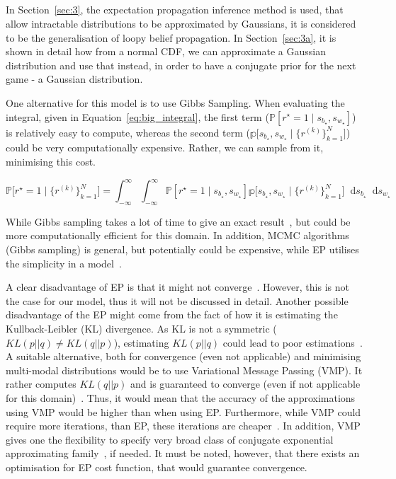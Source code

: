 \documentclass[a4paper,11pt]{article}
\theoremstyle{mytheor}
\newcommand*\diff{\mathop{}\!\mathrm{d}}
\begin{document}
\subsection{}
In Section~\ref{sec:3}, the expectation propagation inference method is used, that allow intractable distributions to be approximated by Gaussians, it is considered to be the generalisation of loopy belief propagation. In Section~\ref{sec:3a}, it is shown in detail how from a normal CDF, we can approximate a Gaussian distribution and use that instead, in order to have a conjugate prior for the next game - a Gaussian distribution.

One alternative for this model is to use Gibbs Sampling. When evaluating the integral, given in Equation~\ref{eq:big_integral}, the first term ($\mathbb{P} [ r^{\star}=1 \mid s_{b_{\star}},s_{w_{\star}} ]$) is relatively easy to compute, whereas the second term ($\mathbb{p} \Big[ s_{b_{\star}},s_{w_{\star}} \mid \{r^{(k)}\}_{k=1}^{N} \Big]$) could be very computationally expensive. Rather, we can sample from it, minimising this cost.

\begin{equation}
    \label{eq:big_integral}
    \mathbb{P} \Big[ r^{\star}=1 \mid \{r^{(k)}\}_{k=1}^{N} \Big] =
    \int_{-\infty}^{\infty} \int_{-\infty}^{\infty} \mathbb{P} [ r^{\star}=1 \mid s_{b_{\star}},s_{w_{\star}} ]
    \mathbb{p} \Big[ s_{b_{\star}},s_{w_{\star}} \mid \{r^{(k)}\}_{k=1}^{N} \Big]
    \diff{s_{b_{\star}}} \diff{s_{w_{\star}}}
\end{equation}

While Gibbs sampling takes a lot of time to give an exact result~\cite{epvsvmp}, but could be more computationally efficient for this domain. In addition, MCMC algorithms (Gibbs sampling) is general, but potentially could be expensive, while EP utilises the simplicity in a model~\cite{minkaep}. 

A clear disadvantage of EP is that it might not converge~\cite{bishop2006pattern}. However, this is not the case for our model, thus it will not be discussed in detail. Another possible disadvantage of the EP might come from the fact of how it is estimating the Kullback-Leibler (KL) divergence. As KL is not a symmetric ($KL(p||q) \neq KL(q||p)$), estimating $KL(p||q)$ could lead to poor estimations~\cite[Figure 10.3]{bishop2006pattern}. A suitable alternative, both for convergence (even not applicable) and minimising multi-modal distributions would be to use Variational Message Passing (VMP). It rather computes $KL(q||p)$ and is guaranteed to converge (even if not applicable for this domain)~\cite{bishop2006pattern,epvsvmp}. Thus, it would mean that the accuracy of the approximations using VMP would be higher than when using EP. Furthermore, while VMP could require more iterations, than EP, these iterations are cheaper~\cite{minka2001expectation,winn2005variational}. In addition, VMP gives one the flexibility to specify very broad class of conjugate exponential approximating family~\cite{winn2005variational}, if needed. It must be noted, however, that there exists an optimisation for EP cost function, that would guarantee convergence\cite{bishop2006pattern}.

\clearpage



\clearpage
\end{document}

